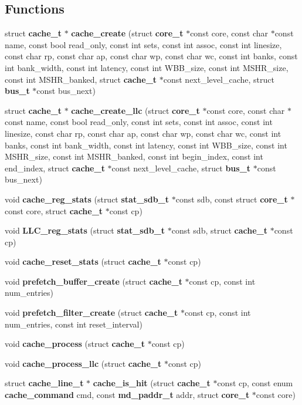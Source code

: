 \subsection*{Functions}
\begin{CompactItemize}
\item 
struct {\bf cache\_\-t} $\ast$ {\bf cache\_\-create} (struct {\bf core\_\-t} $\ast$const core, const char $\ast$const name, const bool read\_\-only, const int sets, const int assoc, const int linesize, const char rp, const char ap, const char wp, const char wc, const int banks, const int bank\_\-width, const int latency, const int WBB\_\-size, const int MSHR\_\-size, const int MSHR\_\-banked, struct {\bf cache\_\-t} $\ast$const next\_\-level\_\-cache, struct {\bf bus\_\-t} $\ast$const bus\_\-next)
\item 
struct {\bf cache\_\-t} $\ast$ {\bf cache\_\-create\_\-llc} (struct {\bf core\_\-t} $\ast$const core, const char $\ast$const name, const bool read\_\-only, const int sets, const int assoc, const int linesize, const char rp, const char ap, const char wp, const char wc, const int banks, const int bank\_\-width, const int latency, const int WBB\_\-size, const int MSHR\_\-size, const int MSHR\_\-banked, const int begin\_\-index, const int end\_\-index, struct {\bf cache\_\-t} $\ast$const next\_\-level\_\-cache, struct {\bf bus\_\-t} $\ast$const bus\_\-next)
\item 
void {\bf cache\_\-reg\_\-stats} (struct {\bf stat\_\-sdb\_\-t} $\ast$const sdb, const struct {\bf core\_\-t} $\ast$const core, struct {\bf cache\_\-t} $\ast$const cp)
\item 
void {\bf LLC\_\-reg\_\-stats} (struct {\bf stat\_\-sdb\_\-t} $\ast$const sdb, struct {\bf cache\_\-t} $\ast$const cp)
\item 
void {\bf cache\_\-reset\_\-stats} (struct {\bf cache\_\-t} $\ast$const cp)
\item 
void {\bf prefetch\_\-buffer\_\-create} (struct {\bf cache\_\-t} $\ast$const cp, const int num\_\-entries)
\item 
void {\bf prefetch\_\-filter\_\-create} (struct {\bf cache\_\-t} $\ast$const cp, const int num\_\-entries, const int reset\_\-interval)
\item 
void {\bf cache\_\-process} (struct {\bf cache\_\-t} $\ast$const cp)
\item 
void {\bf cache\_\-process\_\-llc} (struct {\bf cache\_\-t} $\ast$const cp)
\item 
struct {\bf cache\_\-line\_\-t} $\ast$ {\bf cache\_\-is\_\-hit} (struct {\bf cache\_\-t} $\ast$const cp, const enum {\bf cache\_\-command} cmd, const {\bf md\_\-paddr\_\-t} addr, struct {\bf core\_\-t} $\ast$const core)

\end{CompactItemize}
